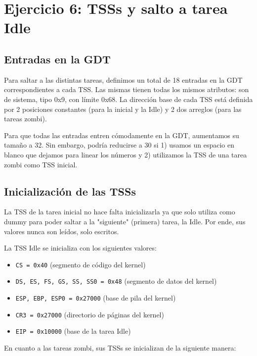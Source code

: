 \section{Ejercicio 6: TSSs y salto a tarea Idle}

	\subsection{Entradas en la GDT}

	Para saltar a las distintas tareas, definimos un total de 18 entradas en la GDT correspondientes a cada TSS. Las mismas tienen todas los mismos atributos: son de sistema, tipo 0x9, con límite 0x68. La dirección base de cada TSS está definida por 2 posiciones constantes (para la inicial y la Idle) y 2 dos arreglos (para las tareas zombi).

	Para que todas las entradas entren cómodamente en la GDT, aumentamos su tamaño a 32. Sin embargo, podría reducirse a 30 si 1) usamos un espacio en blanco que dejamos para linear los números y 2) utilizamos la TSS de una tarea zombi como TSS inicial.

	\subsection{Inicialización de las TSSs}

	La TSS de la tarea inicial no hace falta inicializarla ya que solo utiliza como dummy para poder saltar a la "siguiente" (primera) tarea, la Idle. Por ende, sus valores nunca son leídos, solo escritos.

	La TSS Idle se inicializa con los siguientes valores:

	\begin{itemize}
		\item \texttt{CS = 0x40} (segmento de código del kernel)

		\item \texttt{DS, ES, FS, GS, SS, SS0 = 0x48} (segmento de datos del kernel)

		\item \texttt{ESP, EBP, ESP0 = 0x27000} (base de pila del kernel)

		\item \texttt{CR3 = 0x27000} (directorio de páginas del kernel)

		\item \texttt{EIP = 0x10000} (base de la tarea Idle)
	\end{itemize}

	En cuanto a las tareas zombi, sus TSSs se inicializan de la siguiente manera:

